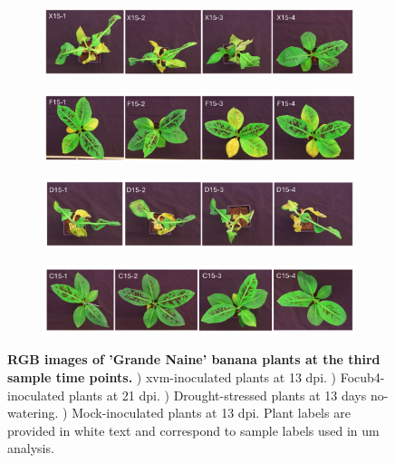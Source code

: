 \begin{figure}[ph!]
  \centering
  \begin{subfigure}[b]{\textwidth}
    \includegraphics[width=\textwidth]{Figures/ThirdTimePointXanthomonasBLQs.pdf}
    \caption{}
    \label{fig:XvmThirdTimeBLQs}
  \end{subfigure}
   \begin{subfigure}[b]{\textwidth}
    \includegraphics[width=\textwidth]{Figures/ThirdTimePointFusariumBLQs.pdf}
    \caption{}
    \label{fig:FocThirdTimeBLQs}
  \end{subfigure}
     \begin{subfigure}[b]{\textwidth}
    \includegraphics[width=\textwidth]{Figures/ThirdTimePointDroughtBLQs.pdf}
    \caption{}
    \label{fig:DroThirdTimeBLQs}
  \end{subfigure}
     \begin{subfigure}[b]{\textwidth}
    \includegraphics[width=\textwidth]{Figures/ThirdTimePointControlBLQs.pdf}
    \caption{}
    \label{fig:ConThirdTimeBLQs}
  \end{subfigure}
  \caption[RGB images of 'Grande Naine' banana plants at the third sample time points.]{\textbf{RGB images of 'Grande Naine' banana plants at the third sample time points.}
  \textbf{}) \acl{xvm}-inoculated plants at 13 \acl{dpi}.
  \textbf{}) \acl{Focub4}-inoculated plants at 21 \acl{dpi}.
  \textbf{}) Drought-stressed plants at 13 days no-watering.
  \textbf{}) Mock-inoculated plants at 13 \ac{dpi}.
  Plant labels are provided in white text and correspond to sample labels used in \acl{um} analysis.
  }
  \label{fig:ThridTimePointSymptoms}
\end{figure}


